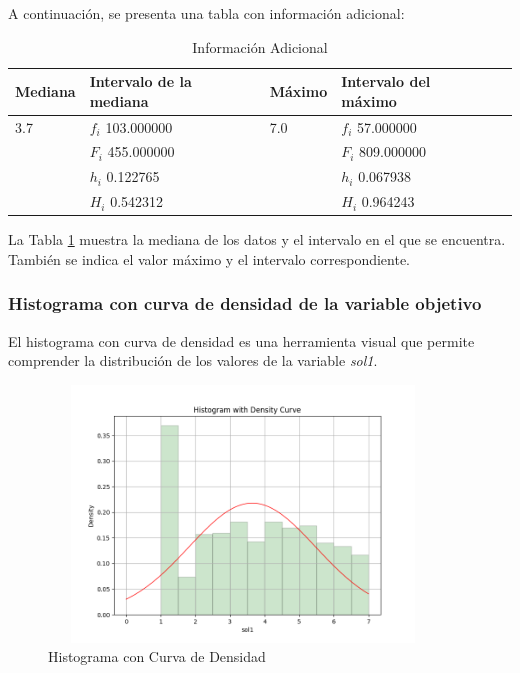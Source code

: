 A continuación, se presenta una tabla con información adicional:

\begin{table}[H]
    \centering
    \caption{Información Adicional}
    \begin{tabular}{lllll}
        \hline
        \textbf{Mediana} & \textbf{Intervalo de la mediana} & \textbf{Máximo} & \textbf{Intervalo del máximo} \\
        \hline
        3.7              & $f_i$ 103.000000                 & 7.0             & $f_i$ 57.000000               \\
                         & $F_i$ 455.000000                 &                 & $F_i$ 809.000000              \\
                         & $h_i$ 0.122765                   &                 & $h_i$ 0.067938                \\
                         & $H_i$ 0.542312                   &                 & $H_i$ 0.964243                \\
        \hline
    \end{tabular}%
    \label{tab:informacion_adicional}%
\end{table}%

La Tabla \ref{tab:informacion_adicional} muestra la mediana de los datos y el intervalo en el que se encuentra. También se indica el valor máximo y el intervalo correspondiente.

\subsubsection{Histograma con curva de densidad de la variable objetivo}

El histograma con curva de densidad es una herramienta visual que permite comprender la distribución de los valores de la variable \textit{sol1}.

\begin{figure}[H]
    \centering
    \includegraphics[width=4.06111in,height=2.68611in]{img/histogramaConCurvaDeDensidad.png}
    \caption{Histograma con Curva de Densidad}
    \label{fig:hist_density}%
\end{figure}%

